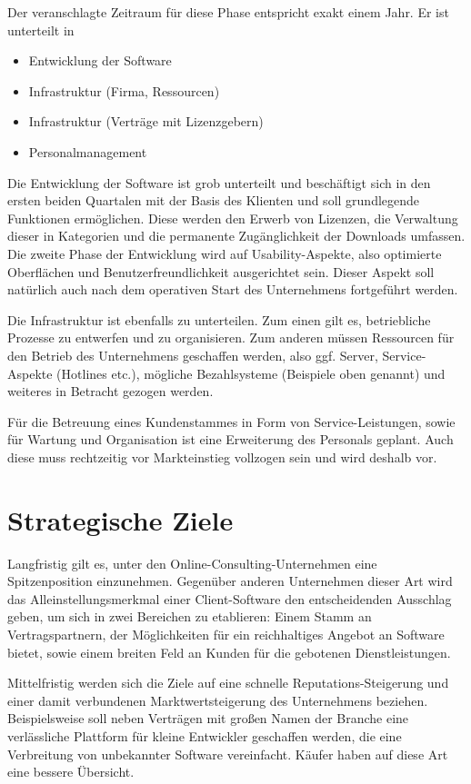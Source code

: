 Der veranschlagte Zeitraum für diese Phase entspricht exakt einem Jahr. Er ist unterteilt in

\begin{itemize}
	\item Entwicklung der Software
	\item Infrastruktur (Firma, Ressourcen)
	\item Infrastruktur (Verträge mit Lizenzgebern)
	\item Personalmanagement
\end{itemize}

Die Entwicklung der Software ist grob unterteilt und beschäftigt sich in den ersten beiden Quartalen mit der Basis des Klienten und soll grundlegende Funktionen ermöglichen. Diese werden den Erwerb von Lizenzen, die Verwaltung dieser in Kategorien und die permanente Zugänglichkeit der Downloads umfassen. Die zweite Phase der Entwicklung wird auf Usability-Aspekte, also optimierte Oberflächen und Benutzerfreundlichkeit ausgerichtet sein. Dieser Aspekt soll natürlich auch nach dem operativen Start des Unternehmens fortgeführt werden.

Die Infrastruktur ist ebenfalls zu unterteilen. Zum einen gilt es, betriebliche Prozesse zu entwerfen und zu organisieren. Zum anderen müssen Ressourcen für den Betrieb des Unternehmens geschaffen werden, also ggf. Server, Service-Aspekte (Hotlines etc.), mögliche Bezahlsysteme (Beispiele oben genannt) und weiteres in Betracht gezogen werden. 

Für die Betreuung eines Kundenstammes in Form von Service-Leistungen, sowie für Wartung und Organisation ist eine Erweiterung des Personals geplant. Auch diese muss rechtzeitig vor Markteinstieg vollzogen sein und wird deshalb vor.

\section{Strategische Ziele}

Langfristig gilt es, unter den Online-Consulting-Unternehmen eine Spitzenposition einzunehmen. Gegenüber anderen Unternehmen dieser Art wird das Alleinstellungsmerkmal einer Client-Software den entscheidenden Ausschlag geben, um sich in zwei Bereichen zu etablieren: Einem Stamm an Vertragspartnern, der Möglichkeiten für ein reichhaltiges Angebot an Software bietet, sowie einem breiten Feld an Kunden für die gebotenen Dienstleistungen.

Mittelfristig werden sich die Ziele auf eine schnelle Reputations-Steigerung und einer damit verbundenen Marktwertsteigerung des Unternehmens beziehen. Beispielsweise soll neben Verträgen mit großen Namen der Branche eine verlässliche Plattform für kleine Entwickler geschaffen werden, die eine Verbreitung von unbekannter Software vereinfacht. Käufer haben auf diese Art eine bessere Übersicht.

